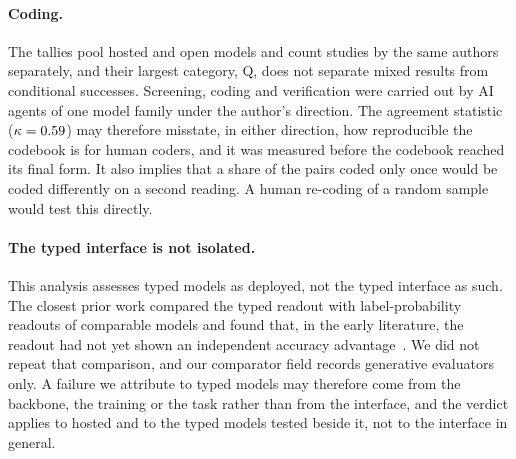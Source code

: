 \paragraph{Coding.}
The tallies pool hosted and open models and count studies by the same authors separately, and their largest category, Q, does not separate mixed results from conditional successes.
Screening, coding and verification were carried out by AI agents of one model family under the author's direction. The agreement statistic ($\kappa = 0.59{}$) may therefore misstate, in either direction, how reproducible the codebook is for human coders, and it was measured before the codebook reached its final form. It also implies that a share of the pairs coded only once would be coded differently on a second reading.
A human re-coding of a random sample would test this directly.

\paragraph{The typed interface is not isolated.}
This analysis assesses typed models as deployed, not the typed interface as such.
The closest prior work compared the typed readout with label-probability readouts of comparable models and found that, in the early literature, the readout had not yet shown an independent accuracy advantage~\cite{arx32160}.
We did not repeat that comparison, and our comparator field records generative evaluators only.
A failure we attribute to typed models may therefore come from the backbone, the training or the task rather than from the interface, and the verdict applies to hosted \jev{} and to the typed models tested beside it, not to the interface in general.
